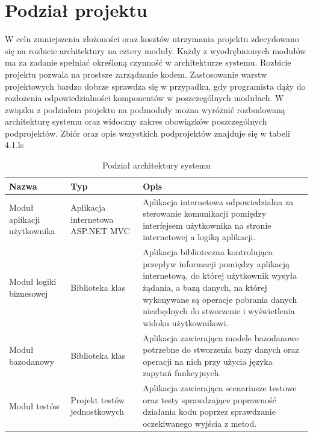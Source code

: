 
\section{Podział projektu}
{W celu zmniejszenia złożoności oraz kosztów utrzymania projektu zdecydowano się na rozbicie architektury na cztery moduły. Każdy z wyodrębnionych modułów ma za zadanie spełniać określoną czynność w architekturze systemu. Rozbicie projektu pozwala  na prostsze zarządzanie kodem. Zastosowanie warstw projektowych bardzo dobrze sprawdza się w przypadku, gdy programista dąży do rozłożenia odpowiedzialności komponentów w poszczególnych modułach.
W związku z podziałem projektu na podmoduły można wyróżnić rozbudowaną architekturę systemu oraz widoczny zakres obowiązków poszczególnych podprojektów. Zbiór oraz opis wszystkich podprojektów znajduje się w tabeli 4.1.ls }

\begin{table}[htbp]
	\caption{Podział architektury systemu}
	\label{sys-architecture}
	\begin{center}
    \begin{tabular}{ | p{3cm}| p{3cm} | p{6cm} |}
    \hline Nazwa & Typ &  Opis \\ \hline   
    \hline  Moduł aplikacji użytkownika &  Aplikacja \mbox{internetowa} ASP.NET MVC & Aplikacja internetowa odpowiedzialna za sterowanie komunikacji pomiędzy interfejsem użytkownika na stronie internetowej a logiką aplikacji.\\ \hline
	\hline  Moduł logiki biznesowej & Biblioteka klas & Aplikacja biblioteczna kontrolująca przepływ informacji pomiędzy aplikacją internetową, do której użytkownik wysyła żądania, a bazą danych, na której wykonywane są operacje pobrania danych niezbędnych do stworzenie i wyświetlenia widoku użytkownikowi.\\ \hline
	\hline Moduł  \mbox{bazodanowy} & Biblioteka klas & Aplikacja zawierająca modele bazodanowe potrzebne do stworzenia bazy danych oraz operacji na nich przy użycia języka zapytań funkcyjnych.\\ \hline
		\hline Moduł testów & Projekt testów jednostkowych & Aplikacja zawierająca scenariusze testowe oraz testy sprawdzające poprawność działania kodu poprzez sprawdzanie oczekiwanego wyjścia z metod.\\ \hline
	\end{tabular}
\end{center}
\end{table}

